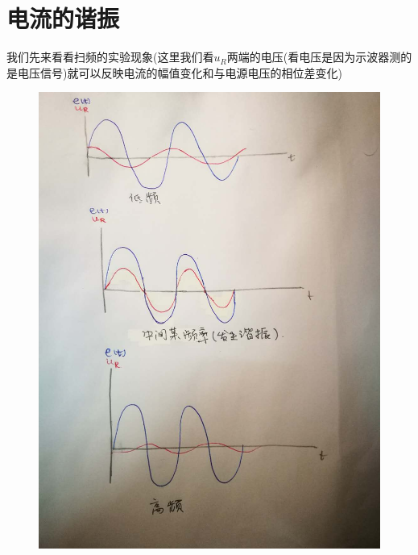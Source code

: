 \documentclass[12pt]{book}
\theoremstyle{definition}\newtheorem{dfn}{Définition}[chapter]
\theoremstyle{plain}\newtheorem{thm}{Théorème}[chapter]
\theoremstyle{plain}\newtheorem{prp}{Proposition}[chapter]
\theoremstyle{plain}\newtheorem{lem}{\bf Lemme}[chapter]
\theoremstyle{plain}\newtheorem{axm}{\bf Axiome}[chapter]
\theoremstyle{plain}\newtheorem{lmm}{\bf Lemme}[chapter]
\theoremstyle{plain}\newtheorem{cor}{\bf Corollaire}[chapter]
\theoremstyle{remark}\newtheorem{rem}{Remarque}[chapter]
\begin{document}
\section{电流的谐振}
我们先来看看扫频的实验现象(这里我们看$u_R$两端的电压(看电压是因为示波器测的是电压信号)就可以反映电流的幅值变化和与电源电压的相位差变化)
\begin{figure}[H]
	\centering
	\includegraphics[scale=0.2]{Etude du circuit RLC serie-Resonances//2}
\end{figure}
\end{document}
